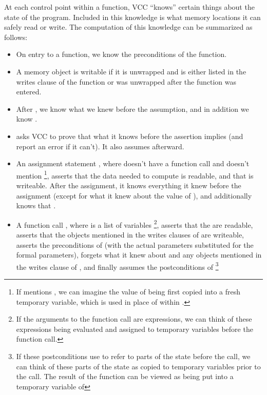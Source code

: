 {{At each control point within a function, VCC ``knows'' certain things
about the state of the program. Included in this knowledge is what
memory locations it can safely read or write. The computation of this
knowledge can be summarized as follows:
\begin{itemize}
\item
On entry to a function, we know the preconditions of the function.
\item
A memory object is writable if it is unwrapped and is either listed in the 
writes clause of the function or was unwrapped after the function was entered.
\item
After , we know what we knew before the assumption,
and in addition we know .
\item
{} asks VCC to prove that what it knows before the
assertion implies  (and report an error if it can't). 
It also assumes  afterward.
\item
{}
An assignment statement , where  doesn't have a 
function call and doesn't mention %
\footnote{
  If  mentions , we can imagine the value of  being
  first copied into a fresh temporary variable, which is used in place
  of  within .
}, asserts that the data needed to
compute  is readable, and that  is writeable. After the
assignment, it knows everything it knew before the assignment (except
for what it knew about the value of ), and additionally knows
that . 
\item 
A function call , where  is a list of variables%
\footnote{
  If the arguments to the function call are expressions, we can think
  of these expressions being evaluated and assigned to temporary
  variables before the function call.
}, asserts that the  are readable, asserts that the objects
mentioned in the writes clauses of  are writeable,
asserts the preconditions of  (with the actual parameters
substituted for the formal parameters), forgets what it knew about
 and any objects mentioned in the writes clause of , and
finally assumes the postconditions of %
\footnote{If these postconditions use \vcc{\\old} to refer to parts of
  the state before the call, we can think of these parts of the state
  as copied to temporary variables prior to the call. The result of
  the function can be viewed as being put into a temporary variable of
}
\end{itemize}}}
